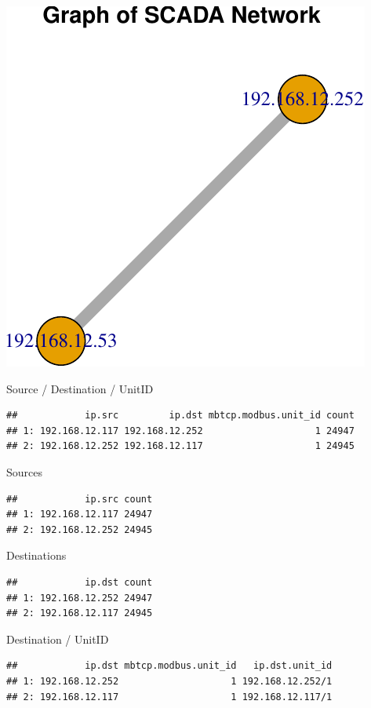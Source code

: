 \documentclass[]{article}
\begin{document}
\begin{center}\includegraphics{modbus_files/figure-latex/warning-1} \end{center}

Source / Destination / UnitID

\begin{verbatim}
##            ip.src         ip.dst mbtcp.modbus.unit_id count
## 1: 192.168.12.117 192.168.12.252                    1 24947
## 2: 192.168.12.252 192.168.12.117                    1 24945
\end{verbatim}

Sources

\begin{verbatim}
##            ip.src count
## 1: 192.168.12.117 24947
## 2: 192.168.12.252 24945
\end{verbatim}

Destinations

\begin{verbatim}
##            ip.dst count
## 1: 192.168.12.252 24947
## 2: 192.168.12.117 24945
\end{verbatim}

Destination / UnitID

\begin{verbatim}
##            ip.dst mbtcp.modbus.unit_id   ip.dst.unit_id
## 1: 192.168.12.252                    1 192.168.12.252/1
## 2: 192.168.12.117                    1 192.168.12.117/1
\end{verbatim}
\end{document}
